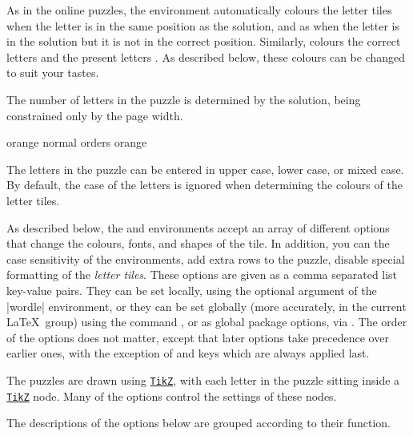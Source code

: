\documentclass[svgnames]{report}
\newcommand\ctan[1]{\href{https://www.ctan.org/pkg/#1}{\texttt{#1}}}
\begin{document}
  As in the online puzzles, the  environment
  automatically colours the letter tiles
  when the letter is in the same position as the solution, and as
   when
  the letter is in the solution but it is not in the correct position.
  Similarly,  colours the correct letters
  and the present letters
  .
  As described below, these colours can be changed to suit your tastes.

  The number of letters in the puzzle is determined by the solution,
  being constrained only by the page width.

  \begin{example}
  \begin{wordle}[rows=4]{orange}
     normal
     orders
     orange
  \end{wordle}
  \end{example}

  The letters in the puzzle can be entered in upper case, lower case, or
  mixed case. By default, the case of the letters is ignored when
  determining the colours of the letter tiles.

  As described below, the  and 
  environments accept an array of different options that change the
  colours, fonts, and shapes of the tile. In addition, you can the case
  sensitivity of the environments, add extra rows to the puzzle, disable
  special formatting of the \textit{letter tiles}.  These options are
  given as a comma separated list key-value pairs.  They can be set
  locally, using the optional argument of the \keyword|wordle|
  environment, or they can be set globally (more accurately, in the
  current \LaTeX\ group) using the \keyword{\WordleSetup} command
  , or as global package options, via
  \keyword{\usepackage[options]{wordle}}.  The order of the options does
  not matter, except that later options take precedence over earlier
  ones, with the exception of  and  keys
  which are always applied last.

  The  puzzles are drawn using \ctan{TikZ}, with each
  letter in the puzzle sitting inside a \ctan{TikZ} node. Many of the
  options control the settings of these nodes.

  The descriptions of the options below are grouped according to their
  function.
\end{document}
